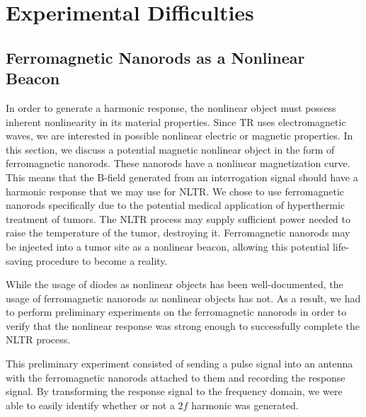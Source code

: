 \section{Experimental Difficulties}
\label{sec:nltr-expr-diff}

\subsection{Ferromagnetic Nanorods as a Nonlinear Beacon}

In order to generate a harmonic response, the nonlinear object must possess inherent nonlinearity in its material properties. Since TR uses electromagnetic waves, we are interested in possible nonlinear electric or magnetic properties. In this section, we discuss a potential magnetic nonlinear object in the form of ferromagnetic nanorods. These nanorods have a nonlinear magnetization curve. This means that the B-field generated from an interrogation signal should have a harmonic response that we may use for NLTR. We chose to use ferromagnetic nanorods specifically due to the potential medical application of hyperthermic treatment of tumors. The NLTR process may supply sufficient power needed to raise the temperature of the tumor, destroying it. Ferromagnetic nanorods may be injected into a tumor site as a nonlinear beacon, allowing this potential life-saving procedure to become a reality. 

While the usage of diodes as nonlinear objects has been well-documented, the usage of ferromagnetic nanorods as nonlinear objects has not. As a result, we had to perform preliminary experiments on the ferromagnetic nanorods in order to verify that the nonlinear response was strong enough to successfully complete the NLTR process.

This preliminary experiment consisted of sending a pulse signal into an antenna with the ferromagnetic nanorods attached to them and recording the response signal. By transforming the response signal to the frequency domain, we were able to easily identify whether or not a $2f$ harmonic was generated.


